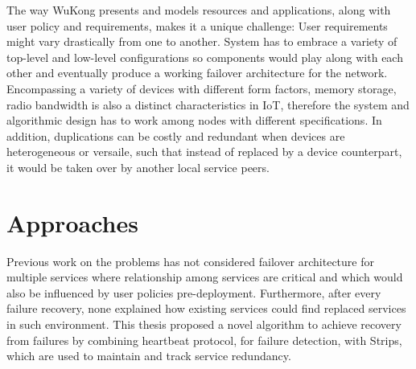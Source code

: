 The way WuKong presents and models resources and applications, along with user
policy and requirements, makes it a unique challenge: User requirements might
vary drastically from one to another. System has to embrace a variety of
top-level and low-level configurations so components would play along with each
other and eventually produce a working failover architecture for the network.
Encompassing a variety of devices with different form factors, memory storage,
radio bandwidth is also a distinct characteristics in IoT,
therefore the system and algorithmic design has to work among nodes
with different specifications. In addition, duplications can be
costly and redundant when devices are heterogeneous or versaile,
such that instead of replaced by a device counterpart, it would be
taken over by another local service peers.



\section{Approaches}

Previous work on the problems has not considered failover architecture for
multiple services where relationship among services are critical and which would
also be influenced by user policies pre-deployment. Furthermore, after every
failure recovery, none explained how existing services could find replaced
services in such environment. This thesis proposed a novel algorithm to achieve
recovery from failures by combining heartbeat protocol, for failure detection,
with Strips, which are used to maintain and track service redundancy. 

